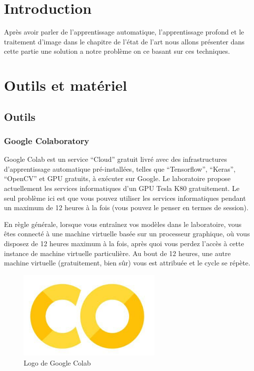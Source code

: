 \documentclass[12pt]{article}
\begin{document}
\section{Introduction}
Après avoir parler de l’apprentissage automatique, l’apprentissage profond et le traitement d’image dans le chapitre de l’état de l’art nous allons présenter dans cette partie une solution a notre problème on ce basant sur ces techniques.

\section{Outils et matériel}
\subsection{Outils}
\subsubsection*{Google Colaboratory}
Google Colab est un service “Cloud” gratuit livré avec des infrastructures d’apprentissage automatique pré-installées, telles que “Tensorflow”, “Keras”, “OpenCV” et GPU gratuits, à exécuter sur Google. Le laboratoire propose actuellement les services informatiques d’un GPU Tesla K80 gratuitement. Le seul problème ici est que vous pouvez utiliser les services informatiques pendant un maximum de 12 heures à la fois (vous pouvez le penser en termes de session). 

En règle générale, lorsque vous entraînez vos modèles dans le laboratoire, vous êtes connecté à une machine virtuelle basée sur un processeur graphique, où vous disposez de 12 heures maximum à la fois, après quoi vous perdez l'accès à cette instance de machine virtuelle particulière. Au bout de 12 heures, une autre machine virtuelle (gratuitement, bien sûr) vous est attribuée et le cycle se répète.

\begin{figure}[h]
	\centering
	\includegraphics[width=7cm]{img-Chapiter-4/colab.png}
	\caption{Logo de Google Colab}
\end{figure}
\end{document}
